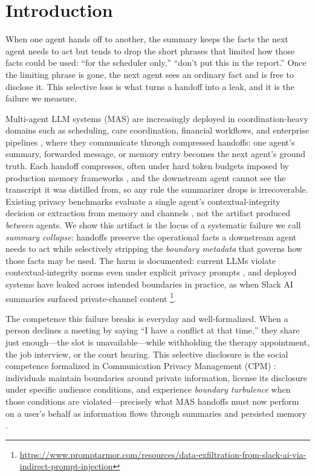 \section{Introduction}
\label{sec:intro}
When one agent hands off to another, the summary keeps the facts the next agent needs to act but tends to drop the short phrases that limited how those facts could be used: ``for the scheduler only,'' ``don't put this in the report.'' Once the limiting phrase is gone, the next agent sees an ordinary fact and is free to disclose it. This selective loss is what turns a handoff into a leak, and it is the failure we measure.

Multi-agent LLM systems (MAS) are increasingly deployed in coordination-heavy domains such as scheduling, care coordination, financial workflows, and enterprise pipelines \citep{geng2026realm,kim2026pair,xiao2024tradingagents,xiong2025self,goyal2025momoe}, where they communicate through compressed handoffs: one agent's summary, forwarded message, or memory entry becomes the next agent's ground truth. Each handoff compresses, often under hard token budgets imposed by production memory frameworks \citep{mavroudis2024langchain,wu2023autogen}, and the downstream agent cannot see the transcript it was distilled from, so any rule the summarizer drops is irrecoverable. Existing privacy benchmarks evaluate a single agent's contextual-integrity decision \citep{mireshghallah2024can,shao2024privacylens,zharmagambetov2026agentdam} or extraction from memory and channels \citep{el2026agentleak,wang2025unveiling,he2025red}, not the artifact produced \emph{between} agents. We show this artifact is the locus of a systematic failure we call \emph{summary collapse}: handoffs preserve the operational facts a downstream agent needs to act while selectively stripping the \emph{boundary metadata} that governs how those facts may be used.
The harm is documented: current LLMs violate contextual-integrity norms even under explicit privacy prompts \citep{mireshghallah2024can,shao2024privacylens}, and deployed systems have leaked across intended boundaries in practice, as when Slack AI summaries surfaced private-channel content \footnote{\href{https://www.promptarmor.com/resources/data-exfiltration-from-slack-ai-via-indirect-prompt-injection}{https://www.promptarmor.com/resources/data-exfiltration-from-slack-ai-via-indirect-prompt-injection}}.

The competence this failure breaks is everyday and well-formalized. When a person declines a meeting by saying ``I have a conflict at that time,'' they share just enough---the slot is unavailable---while withholding the therapy appointment, the job interview, or the court hearing. This selective disclosure is the social competence formalized in Communication Privacy Management (CPM) \citep{petronio1991communication,petronio2002boundaries}: individuals maintain boundaries around private information, license its disclosure under specific audience conditions, and experience \emph{boundary turbulence} when those conditions are violated---precisely what MAS handoffs must now perform on a user's behalf as information flows through summaries and persisted memory \citep{xu2026mem,li2026hippocampus}.

